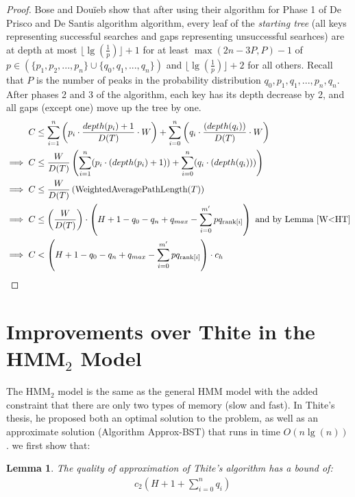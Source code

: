 \documentclass[letterpaper,12pt,titlepage,oneside,final]{book}
\theoremstyle{plain}
\newtheorem{lem}[thm]{Lemma}
\begin{document}
\begin{proof}

Bose and Dou\"{i}eb show that after using their algorithm for Phase 1 of De Prisco and De Santis algorithm algorithm, every leaf of the \textit{starting tree} (all keys representing successful searches and gaps representing unsuccessful searhces) are at depth at most $\lfloor \lg(\frac{1}{p}) \rfloor + 1$  for at least $\max(2n-3P,P)-1$ of $p \in \left( \{p_1, p_2, ..., p_n \} \cup \{ q_0, q_1, ..., q_n \} \right)$ and $\lfloor \lg(\frac{1}{p}) \rfloor + 2$ for all others. Recall that $P$ is the number of peaks in the probability distribution $q_0, p_1, q_1, ..., p_n, q_n$. After phases 2 and 3 of the algorithm, each key has its depth decrease by 2, and all gaps (except one) move up the tree by one.
\begin{align*}
C &\leq \sum_{i=1}^{n} \left(p_i\cdot \frac{depth(p_i)+1}{D(T)}\cdot  W \right)+ \sum_{i=0}^{n} \left(q_i\cdot \frac{(depth(q_i))}{D(T)}\cdot  W \right) \\
\implies C &\leq \frac{W}{D(T)} \left(\sum_{i=1}^{n}(p_i\cdot (depth(p_i)+1))+ \sum_{i=0}^{n}(q_i\cdot (depth(q_i))) \right) \\
\implies C &\leq \frac{W}{D(T)} \left(\text{WeightedAveragePathLength}(T) \right) \\
\implies C &\leq  \left( \frac{W}{D(T)} \right) \cdot  \left(H + 1 - q_0 - q_n + q_{max} - \sum_{i=0}^{m'} pq_{\text{rank}[i]} \right) \text{ and by Lemma~\ref{W<HT}} \\
\implies C &<  \left(H + 1 - q_0 - q_n + q_{max} - \sum_{i=0}^{m'} pq_{\text{rank}[i]} \right)\cdot c_h
\end{align*}

\end{proof}


\section{Improvements over Thite in the HMM$_2$ Model}

The HMM$_2$ model is the same as the general HMM model with the added constraint that there are only two types of memory (slow and fast). In Thite's thesis, he proposed both an optimal solution to the problem, as well as an approximate solution (Algorithm Approx-BST) that runs in time $O(n \lg(n))$ \cite{thite2008optimum}. we first show that:
\begin{lem}
The quality of approximation of Thite's algorithm has a bound of: 
\begin{align*}
&c_2(H+1+\sum_{i=0}^{n}q_i)
\end{align*}
\end{lem}
\end{document}
